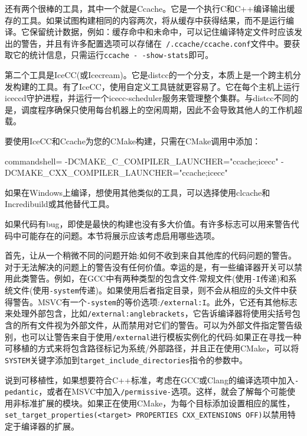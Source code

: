 还有两个很棒的工具，其中一个就是Ccache。它是一个执行C和C++编译输出缓存的工具。如果试图构建相同的内容两次，将从缓存中获得结果，而不是运行编译。它保留统计数据，例如：缓存命中和未命中，可以记住编译特定文件时应该发出的警告，并且有许多配置选项可以存储在\texttt{~/.ccache/ccache.conf}文件中。要获取它的统计信息，只需运行\texttt{ccache -\,-show-stats}即可。

第二个工具是IceCC(或Icecream)。它是distcc的一个分支，本质上是一个跨主机分发构建的工具。有了IceCC，使用自定义工具链就更容易了。它在每个主机上运行iceccd守护进程，并运行一个icecc-scheduler服务来管理整个集群。与distcc不同的是，调度程序确保只使用每台机器上的空闲周期，因此不会导致其他人的工作机超载。

要使用IceCC和Ccache为您的CMake构建，只需在CMake调用中添加：

\begin{tcblisting}{commandshell={}}
-DCMAKE_C_COMPILER_LAUNCHER="ccache;icecc"
-DCMAKE_CXX_COMPILER_LAUNCHER="ccache;icecc"
\end{tcblisting}

如果在Windows上编译，想使用其他类似的工具，可以选择使用clcache和Incredibuild或其他替代工具。


如果代码有bug，即使是最快的构建也没有多大价值。有许多标志可以用来警告代码中可能存在的问题。本节将展示应该考虑启用哪些选项。

首先，让从一个稍微不同的问题开始:如何不收到来自其他库的代码问题的警告。对于无法解决的问题上的警告没有任何价值。幸运的是，有一些编译器开关可以禁用此类警告。例如，在GCC中有两种类型的包含文件:常规文件(使用\texttt{-I}传递)和系统文件(使用\texttt{-system}传递)。如果使用后者指定目录，则不会从相应的头文件中获得警告。MSVC有一个\texttt{-system}的等价选项:\texttt{/external:I}。此外，它还有其他标志来处理外部包含，比如\texttt{/external:anglebrackets}，它告诉编译器将使用尖括号包含的所有文件视为外部文件，从而禁用对它们的警告。可以为外部文件指定警告级别，也可以让警告来自于使用\texttt{/external}进行模板实例化的代码:如果正在寻找一种可移植的方式来将包含路径标记为系统/外部路径，并且正在使用CMake，可以将\texttt{SYSTEM}关键字添加到\texttt{target\_include\_directories}指令的参数中。

说到可移植性，如果想要符合C++标准，考虑在GCC或Clang的编译选项中加入\texttt{-pedantic}，或者在MSVC中加入\texttt{/permissive-}选项。这样，就会了解每个可能使用非标准扩展的模块。如果正在使用CMake，为每个目标添加设置相应的属性，\texttt{set\_target\_properties(<target> PROPERTIES CXX\_EXTENSIONS OFF)}以禁用特定于编译器的扩展。

